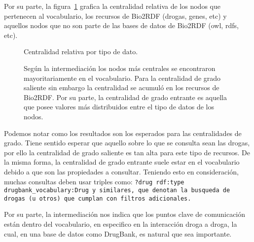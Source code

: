 Por su parte, la figura~\ref{fig:comptype} grafica la centralidad relativa de
los nodos que pertenecen al vocabulario, los recursos de Bio2RDF (drogas, genes,
etc) y aquellos nodos que no son parte de las bases de datos de Bio2RDF (owl,
rdfs, etc).
\begin{figure}[h]
  \caption{Centralidad relativa por tipo de dato.}
  \caption*{\small
    Según la intermediación los nodos más centrales se encontraron
    mayoritariamente en el vocabulario. Para la centralidad de grado
    saliente sin embargo la centralidad se acumuló en los recursos de Bio2RDF.
    Por su parte, la centralidad de grado entrante es aquella que posee valores
    más distribuidos entre el tipo de datos de los nodos.
  }
  \label{fig:comptype}
\end{figure}

Podemos notar como los resultados son los esperados para las centralidades de
grado.
Tiene sentido esperar que aquello sobre lo que se consulta sean las  drogas, por
ello la centralidad de grado saliente es tan alta para este tipo de recursos.
De la misma forma, la centralidad de grado entrante suele estar en el
vocabulario debido a que son las propiedades a consultar.
Teniendo esto en consideración, muchas consultas deben usar triples
como: \tt{?drug rdf:type drugbank\_vocabulary:Drug} y similares, que denotan la
busqueda de drogas (u otros) que cumplan con filtros adicionales.

Por su parte, la intermediación nos indica que los puntos clave de comunicación
están dentro del vocabulario, en especifico en la interacción droga a droga, la
cual, en una base de datos como DrugBank, es natural que sea importante.

